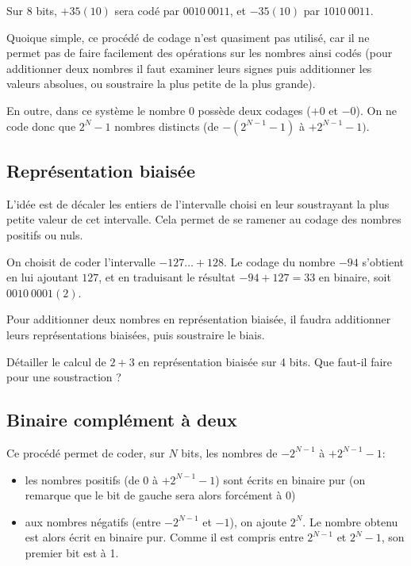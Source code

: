 \begin{exemple}{} Sur 8 bits, $+35 (10)$ sera cod\'e par $0010\ 0011$, et 
$-35 (10)$ par $1010\ 0011$. 
\end{exemple}

Quoique simple, ce proc\'ed\'e de codage n'est quasiment pas utilis\'e, car il
ne permet pas de faire facilement des op\'erations sur les nombres ainsi
cod\'es (pour additionner deux nombres il faut examiner leurs signes puis
additionner les valeurs absolues, ou soustraire la plus petite de la plus 
grande).

En outre, dans ce syst\`eme le nombre 0 possède
deux codages  ($+0$ et $-0$). On ne code donc que $2^N-1$ nombres 
distincts (de $-(2^{N-1}-1)$ \`a $+2^{N-1}-1)$.

\subsection{Repr\'esentation biais\'ee}

L'id\'ee est de d\'ecaler les entiers de l'intervalle choisi
en leur soustrayant la plus petite valeur de cet intervalle. Cela permet
de se ramener au codage des nombres positifs ou nuls.

\begin{exemple}{} On choisit de coder l'intervalle  $-127\ldots+128$. Le codage du 
nombre $-94$ s'obtient en lui ajoutant $127$, et en traduisant le r\'esultat
$-94+127=33$ en binaire, soit $0010\ 0001 (2)$.
\end{exemple}

Pour additionner deux nombres en représentation biaisée, il faudra additionner
leurs représentations biaisées, puis soustraire le biais.

\begin{exercice}{}
Détailler le calcul de $2+3$ en représentation biaisée sur 4 bits.
Que faut-il faire pour une soustraction ?
\end{exercice}

\subsection{Binaire compl\'ement \`a deux}

Ce proc\'ed\'e permet de coder, sur $N$ bits,
 les nombres de $-2^{N-1}$ \`a $+2^{N-1}-1$:
\begin{itemize}
\item les nombres positifs (de 0 \`a $+2^{N-1}-1$) sont \'ecrits en binaire pur 
(on remarque que le bit de gauche sera alors forc\'ement \`a 0)
\item aux nombres n\'egatifs (entre $-2^{N-1}$ et $-1$), on ajoute $2^N$.
Le nombre obtenu est alors \'ecrit en binaire pur. Comme il est compris 
entre $2^{N-1}$ et $2^N-1$, son premier bit est \`a 1.
\end{itemize}

